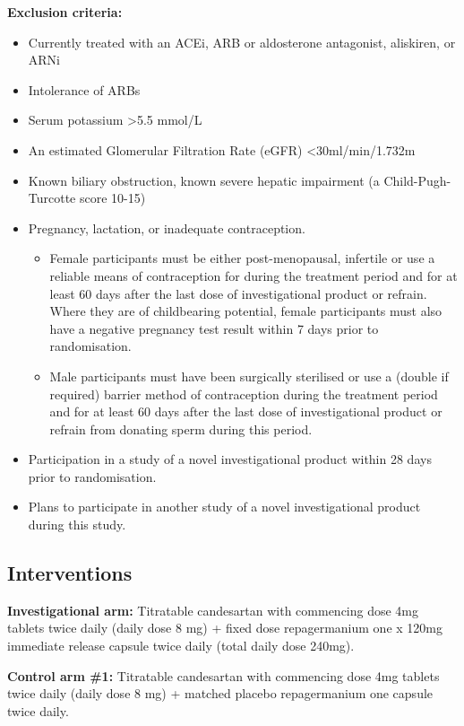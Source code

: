 \documentclass[11pt,parskip=half-]{scrartcl}
\begin{document}
\textbf{Exclusion criteria:}
\begin{itemize}
    \item Currently treated with an ACEi, ARB or aldosterone antagonist, aliskiren, or ARNi
    \item Intolerance of ARBs
    \item Serum potassium >5.5 mmol/L
    \item An estimated Glomerular Filtration Rate (eGFR) <30ml/min/1.732m
    \item Known biliary obstruction, known severe hepatic impairment (a Child-Pugh-Turcotte score 10-15)
    \item Pregnancy, lactation, or inadequate contraception.
          \begin{itemize}
              \item Female participants must be either post-menopausal, infertile or use a reliable means of contraception for during the treatment period and for at least 60 days after the last dose of investigational product or refrain. Where they are of childbearing potential, female participants must also have a negative pregnancy test result within 7 days prior to randomisation.
              \item Male participants must have been surgically sterilised or use a (double if required) barrier method of contraception during the treatment period and for at least 60 days after the last dose of investigational product or refrain from donating sperm during this period.
          \end{itemize}
    \item Participation in a study of a novel investigational product within 28 days prior to randomisation.
    \item Plans to participate in another study of a novel investigational product during this study.
\end{itemize}

\subsection{Interventions}
\textbf{Investigational arm:} Titratable candesartan with commencing dose 4mg tablets twice daily (daily dose 8 mg) + fixed dose repagermanium one x 120mg immediate release capsule twice daily (total daily dose 240mg).

\textbf{Control arm \#1:} Titratable candesartan with commencing dose 4mg tablets twice daily (daily dose 8 mg) + matched placebo repagermanium one capsule twice daily.
\end{document}
